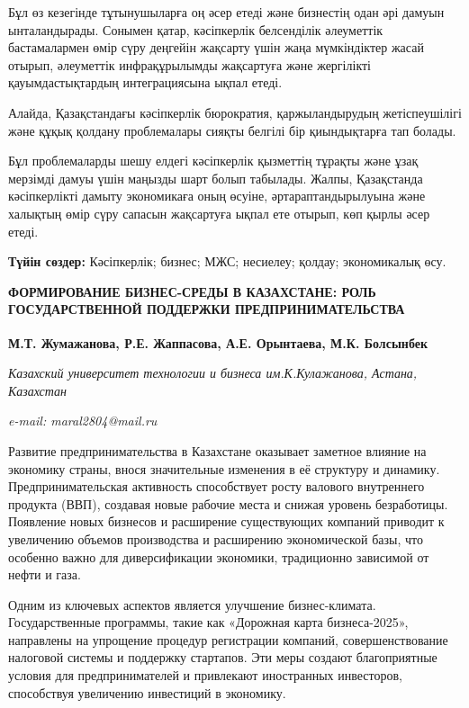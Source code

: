 Бұл өз кезегінде тұтынушыларға оң әсер етеді және бизнестің одан әрі
дамуын ынталандырады. Сонымен қатар, кәсіпкерлік белсенділік әлеуметтік
бастамалармен өмір сүру деңгейін жақсарту үшін жаңа мүмкіндіктер жасай
отырып, әлеуметтік инфрақұрылымды жақсартуға және жергілікті
қауымдастықтардың интеграциясына ықпал етеді.

Алайда, Қазақстандағы кәсіпкерлік бюрократия, қаржыландырудың
жетіспеушілігі және құқық қолдану проблемалары сияқты белгілі бір
қиындықтарға тап болады.

Бұл проблемаларды шешу елдегі кәсіпкерлік қызметтің тұрақты және ұзақ
мерзімді дамуы үшін маңызды шарт болып табылады. Жалпы, Қазақстанда
кәсіпкерлікті дамыту экономикаға оның өсуіне, әртараптандырылуына және
халықтың өмір сүру сапасын жақсартуға ықпал ете отырып, көп қырлы әсер
етеді.

{\bfseries Түйін сөздер:} Кәсіпкерлік; бизнес; МЖС; несиелеу; қолдау;
экономикалық өсу.

\begin{articleheader}
{\bfseries ФОРМИРОВАНИЕ БИЗНЕС-СРЕДЫ В КАЗАХСТАНЕ: РОЛЬ ГОСУДАРСТВЕННОЙ ПОДДЕРЖКИ ПРЕДПРИНИМАТЕЛЬСТВА}

{\bfseries
М.Т. Жумажанова\textsuperscript{\envelope },
Р.Е. Жаппасова,
А.Е. Орынтаева,
М.К. Болсынбек}
\end{articleheader}

\begin{affiliation}
\emph{Казахский университет технологии и бизнеса им.К.Кулажанова,
Астана, Казахстан}

\emph{e-mail: maral2804@mail.ru}
\end{affiliation}

Развитие предпринимательства в Казахстане оказывает заметное влияние на
экономику страны, внося значительные изменения в её структуру и
динамику. Предпринимательская активность способствует росту валового
внутреннего продукта (ВВП), создавая новые рабочие места и снижая
уровень безработицы. Появление новых бизнесов и расширение существующих
компаний приводит к увеличению объемов производства и расширению
экономической базы, что особенно важно для диверсификации экономики,
традиционно зависимой от нефти и газа.

Одним из ключевых аспектов является улучшение бизнес-климата.
Государственные программы, такие как «Дорожная карта бизнеса-2025»,
направлены на упрощение процедур регистрации компаний, совершенствование
налоговой системы и поддержку стартапов. Эти меры создают благоприятные
условия для предпринимателей и привлекают иностранных инвесторов,
способствуя увеличению инвестиций в экономику.

